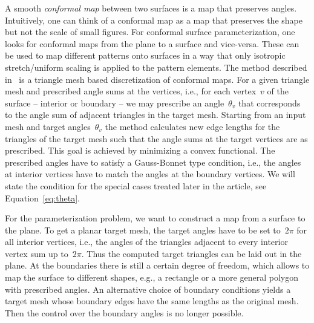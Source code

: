\documentclass[article.tex]{subfiles}
\begin{document}
A smooth \emph{conformal map} between two surfaces is a map that
preserves angles. Intuitively, one can think of a conformal map as a
map that preserves the shape but not the scale of small figures. For
conformal surface parameterization, one looks for conformal
maps from the plane to a surface and vice-versa. These can be used to 
map different patterns onto surfaces in a way that only isotropic
stretch/uniform scaling is applied to the pattern elements.
%
The method described in~\cite{SSP08} is a triangle mesh based
discretization of conformal maps. For a given triangle mesh and
prescribed angle sums at the vertices, i.e., for each vertex~$v$ of
the surface -- interior or boundary -- we may prescribe an
angle~$\theta_v$ that corresponds to the angle sum of adjacent
triangles in the target mesh.  Starting from an input mesh and target
angles~$\theta_v$ the method calculates new edge lengths for the
triangles of the target mesh such that the angle sums at the target
vertices are as prescribed. This goal is achieved by minimizing a
convex functional.  
%
The prescribed angles have to satisfy a Gauss-Bonnet type condition,
i.e., the angles at interior vertices have to match the angles at the
boundary vertices.  We will state the condition for the special cases
treated later in the article, see Equation~\ref{eq:theta}.

For the parameterization problem, we want to construct a map from a
surface to the plane. To get a planar target mesh, the target angles
have to be set to~$2\pi$ for all interior vertices, i.e., the angles
of the triangles adjacent to every interior vertex sum up
to~$2\pi$. Thus the computed target triangles can be laid out in the
plane. At the boundaries there is still a certain degree of freedom,
which allows to map the surface to different shapes, e.g., a rectangle
or a more general polygon with prescribed angles. 
%
An alternative choice of boundary conditions yields a target mesh
whose boundary edges have the same lengths as the original mesh. Then
the control over the boundary angles is no longer possible.

\end{document}
